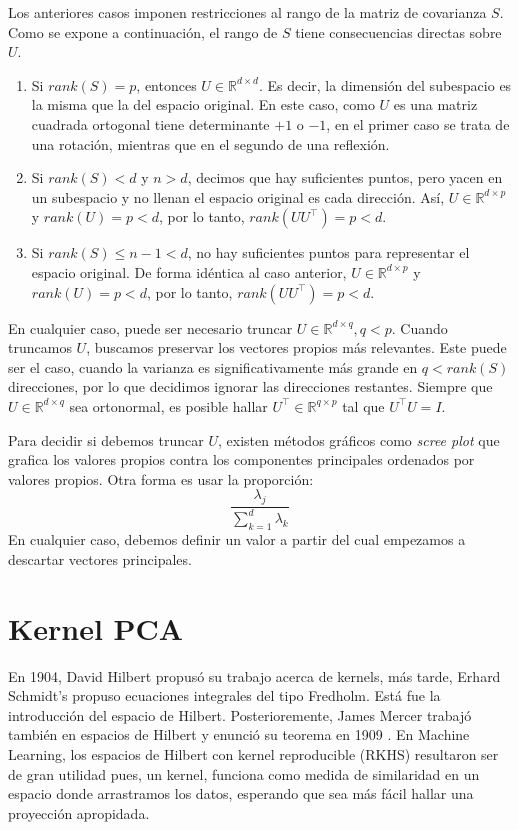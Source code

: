 \documentclass{article}
\numberwithin{equation}{section}
\theoremstyle{remark}
\theoremstyle{definition}
\theoremstyle{remark}
\theoremstyle{remark}
\begin{document}
Los anteriores casos imponen restricciones al rango de la matriz de covarianza $S$. Como se expone a
continuación, el rango de $S$ tiene consecuencias directas sobre $U$. 

\begin{enumerate}
\item Si $rank(S) = p$, entonces $U \in \mathbb{R}^{d \times d}$. Es decir, la dimensión del subespacio es
la misma que la del espacio original.
En este caso, como $U$ es una matriz cuadrada ortogonal tiene determinante $+1$ o $-1$, en el primer
caso se trata de una rotación, mientras que en el segundo de una reflexión.

\item Si $rank(S) < d$ y $n > d$, decimos que hay suficientes puntos, pero yacen en un subespacio y no llenan el 
espacio original es cada dirección. Así, $U \in \mathbb{R}^{d \times p}$ y $rank(U) = p < d$, por lo tanto,
$rank(U U^\intercal) = p < d$.

\item Si $rank(S) \leq n - 1 < d$, no hay suficientes puntos para representar el espacio original. De forma idéntica
al caso anterior, $U \in \mathbb{R}^{d \times p}$ y $rank(U) = p < d$, por lo tanto,
$rank(U U^\intercal) = p < d$.
\end{enumerate}

En cualquier caso, puede ser necesario truncar $U \in \mathbb{R}^{d \times q}, q < p$. Cuando truncamos $U$, buscamos preservar los
vectores propios más relevantes. Este puede ser el caso, cuando la varianza es significativamente más grande en 
$q < rank(S)$ direcciones, por lo que decidimos ignorar las direcciones restantes. Siempre que $U \in \mathbb{R}^{d \times q}$ sea 
ortonormal, es posible hallar $U^\intercal \in \mathbb{R}^{q \times p}$ tal que $U^\intercal U = I$.

Para decidir si debemos truncar $U$, existen métodos gráficos como \textit{scree plot} que grafica los valores propios contra los 
componentes principales ordenados por valores propios. Otra forma es usar la proporción:
$$\frac{\lambda_j}{\sum^d_{k = 1}\lambda_k}$$
En cualquier caso, debemos definir un valor a partir del cual empezamos a descartar vectores principales.

\pagebreak

\section{Kernel PCA}
En 1904, David Hilbert propusó su trabajo acerca de kernels, más tarde, Erhard Schmidt's propuso
ecuaciones integrales del tipo Fredholm. Está fue la introducción del espacio de Hilbert. 
Posterioremente, James Mercer trabajó también en espacios de Hilbert y enunció su teorema en 1909 \parencite{reproducingKHS}.
En Machine Learning, los espacios de Hilbert con kernel reproducible (RKHS) resultaron ser de gran 
utilidad pues, un kernel, funciona como medida de similaridad en un espacio donde arrastramos los datos, esperando
que sea más fácil hallar una proyección apropidada.
\end{document}
